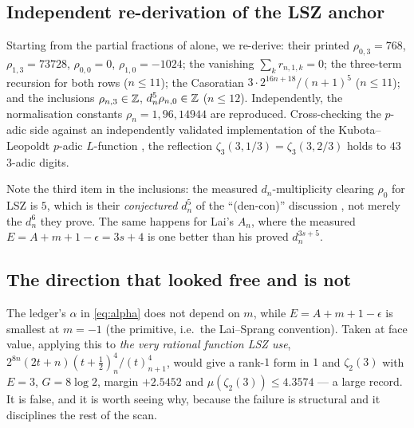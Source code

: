 \subsection{Independent re-derivation of the LSZ anchor}\label{ss:lszrederiv}

\begin{finding}\label{find:lszanchor}
 Starting from the partial fractions
of \cite[Def.~10]{LSZ2025} alone, we re-derive: their printed
$\rho_{0,3}=768$, $\rho_{1,3}=73728$, $\rho_{0,0}=0$, $\rho_{1,0}=-1024$; the vanishing
$\sum_kr_{n,1,k}=0$; the three-term recursion for both rows ($n\le11$); the Casoratian
$3\cdot2^{16n+18}/(n+1)^5$ ($n\le11$); and the inclusions $\rho_{n,3}\in\mathbb{Z}$,
$d_n^5\rho_{n,0}\in\mathbb{Z}$ ($n\le12$). Independently, the normalisation constants
$\rho_n=1,96,14944$ are reproduced. Cross-checking the $p$-adic side against an
independently validated implementation of the Kubota--Leopoldt $p$-adic $L$-function
\cite{KubotaLeopoldt1964}, the reflection $\zeta_3(3,1/3)=\zeta_3(3,2/3)$ holds to $43$
$3$-adic digits.
\end{finding}

Note the third item in the inclusions: the measured $d_n$-multiplicity clearing $\rho_0$ for
LSZ is $5$, which is their \emph{conjectured} $d_n^5$ of the ``(den-con)'' discussion
\cite[Final remarks]{LSZ2025}, not merely the $d_n^6$ they prove. The same happens for Lai's
$A_n$, where the measured $E=A+m+1-\epsilon=3s+4$ is one better than his proved
$d_n^{3s+5}$.

\subsection{The direction that looked free and is not}\label{ss:mminus1}

The ledger's $\alpha$ in \eqref{eq:alpha} does not depend on $m$, while $E=A+m+1-\epsilon$
is smallest at $m=-1$ (the primitive, i.e.\ the Lai--Sprang convention). Taken at face
value, applying this to \emph{the very rational function LSZ use},
$2^{8n}(2t+n)(t+\tfrac12)_n^4/(t)_{n+1}^4$, would give a rank-$1$ form in $1$ and
$\zeta_2(3)$ with $E=3$, $G=8\log2$, margin $+2.5452$ and $\mu(\zeta_2(3))\le4.3574$ --- a
large record. It is false, and it is worth seeing why, because the failure is structural and
it disciplines the rest of the scan.

